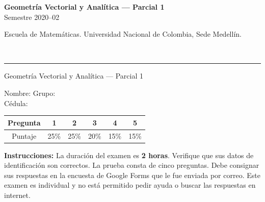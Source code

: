 \documentclass[11pt]{article}
\begin{document}
\noindent
\begin{minipage}[t]{0.6\linewidth}
{\small\bfseries Geometría Vectorial y Analítica --- Parcial 1}\\
{\small Semestre 2020--02}
\end{minipage}%
\hfill
\begin{minipage}[t]{0.35\linewidth}
\raggedleft\small Escuela de Matemáticas. Universidad Nacional de Colombia, Sede Medellín.
\end{minipage}\\[2pt]
\rule{\linewidth}{0.6pt}

\vspace{6pt}
\noindent Geometría Vectorial y Analítica --- Parcial 1

\vspace{4pt}
\noindent Nombre: \underline{\hspace{6cm}}\hfill Grupo: \underline{\hspace{2cm}}\\[4pt]
Cédula: \underline{\hspace{6cm}}

\vspace{10pt}
\begin{center}
\begin{tabular}{|c|c|c|c|c|c|}
\hline
Pregunta & 1 & 2 & 3 & 4 & 5 \\
\hline
Puntaje & 25\% & 25\% & 20\% & 15\% & 15\% \\
\hline
\end{tabular}
\end{center}

\vspace{10pt}
\textbf{Instrucciones:} La duración del examen es \textbf{2 horas}. Verifique que sus datos de identificación son correctos. La prueba consta de cinco preguntas. Debe consignar sus respuestas en la encuesta de Google Forms que le fue enviada por correo. Este examen es individual y no está permitido pedir ayuda o buscar las respuestas en internet.
\end{document}
